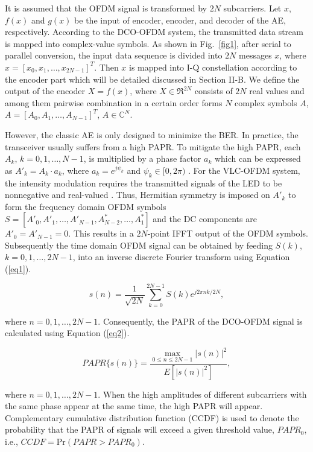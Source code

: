 \documentclass[conference]{IEEEtran}
\begin{document}
It is assumed that the OFDM signal is transformed by $2N$ subcarriers. Let $x$, $f(x)$ and $g(x)$ be the input of encoder, encoder, and decoder of the AE, respectively. According to the DCO-OFDM system, the transmitted data stream is mapped into complex-value symbols. As shown in Fig.~\ref{fig1}, after serial to parallel conversion, the input data sequence is divided into $2N$ messages $x$, where $x = [x_0, x_1, \dots , x_{2N-1}]^T$. Then $x$ is mapped into I-Q constellation according to the encoder part which will be detailed discussed in Section II-B. We define the output of the encoder $X = f(x)$, where $X \in \Re^{2N}$ consists of $2N$ real values and among them pairwise combination in a certain order forms $N$ complex symbols $A$, $A = [A_0, A_1, \dots , A_{N-1}]^T$, $A \in \mathbb{C}^N$.

However, the classic AE is only designed to minimize the BER. In practice, the transceiver usually suffers from a high PAPR. To mitigate the high PAPR, each $A_k$, $k = 0, 1, \dots , N - 1$, is multiplied by a phase factor $a_k$ which can be expressed as $A'_k = A_k \cdot a_k$, where $a_k = e^{j\psi_k}$ and $\psi_k \in [0, 2\pi)$ \cite{b29}. For the VLC-OFDM system, the intensity modulation requires the transmitted signals of the LED to be nonnegative and real-valued \cite{b5}. Thus, Hermitian symmetry is imposed on $A'_k$ to form the frequency domain OFDM symbols $S = [A'_0, A'_1, \dots , A'_{N-1}, A_{N-2}^*, \dots , A_{1}^*]$ and the DC components are $A'_0 = A'_{N-1} = 0$. This results in a $2N$-point IFFT output of the OFDM symbols. Subsequently the time domain OFDM signal can be obtained by feeding $S(k)$, $k = 0, 1, \dots , 2N - 1$, into an inverse discrete Fourier transform using Equation (\ref{eq1}).

\begin{equation}
s(n) = \frac{1}{\sqrt{2N}} \sum_{k=0}^{2N-1} S(k)e^{j2\pi nk/2N},
\label{eq1}
\end{equation}

where $n = 0, 1, \dots , 2N - 1$.
Consequently, the PAPR of the DCO-OFDM signal is calculated using Equation (\ref{eq2}).

\begin{equation}
PAPR\{s(n)\} = \frac{\max_{0\leq n\leq 2N-1}|s(n)|^2}{E\left[|s(n)|^2\right]} ,
\label{eq2}
\end{equation}

where $n = 0, 1, \dots , 2N - 1$. When the high amplitudes of different subcarriers with the same phase appear at the same time, the high PAPR will appear. Complementary cumulative distribution function (CCDF) is used to denote the probability that the PAPR of signals will exceed a given threshold value, $PAPR_0$, i.e., $CCDF = \text{Pr}(PAPR > PAPR_0)$.
\end{document}
